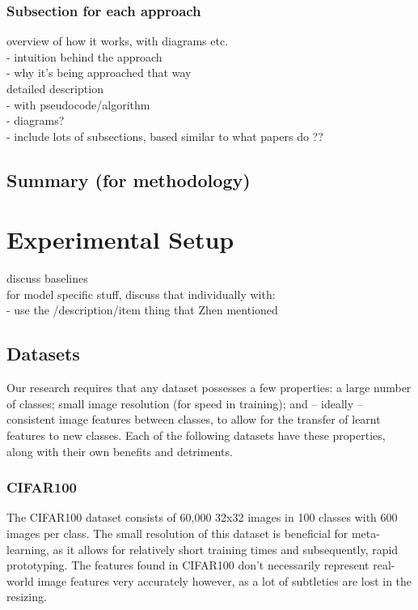 \documentclass{report}
\begin{document}
\subsection{Subsection for each approach}
overview of how it works, with diagrams etc. \\
- intuition behind the approach \\
- why it's being approached that way \\
detailed description \\
- with pseudocode/algorithm \\
- diagrams? \\
- include lots of subsections, based similar to what papers do ?? \\

\section{Summary (for methodology)}


\chapter{Experimental Setup}
discuss baselines \\
for model specific stuff, discuss that individually with: \\
- use the /description{/item{}} thing that Zhen mentioned \\

\section{Datasets}
Our research requires that any dataset possesses a few properties: a large number of classes; small image resolution (for speed in training); and -- ideally -- consistent image features between classes, to allow for the transfer of learnt features to new classes. Each of the following datasets have these properties, along with their own benefits and detriments.

\subsection{CIFAR100}
The CIFAR100\parencite{cifar100} dataset consists of 60,000 32x32 images in 100 classes with 600 images per class. The small resolution of this dataset is beneficial for meta-learning, as it allows for relatively short training times and subsequently, rapid prototyping. The features found in CIFAR100 don't necessarily represent real-world image features very accurately however, as a lot of subtleties are lost in the resizing.
\end{document}
